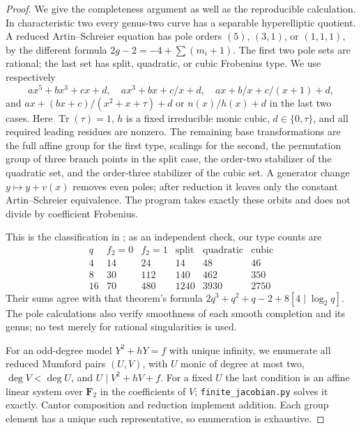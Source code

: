 \begin{proof}
We give the completeness argument as well as the reproducible
calculation.  In characteristic two every genus-two curve has a
separable hyperelliptic quotient.  A reduced Artin--Schreier equation
has pole orders $(5)$, $(3,1)$, or $(1,1,1)$, by the different formula
$2g-2=-4+\sum(m_i+1)$.  The first two pole sets are rational; the
last set has split, quadratic, or cubic Frobenius type.  We use
respectively
\[
 ax^5+bx^3+cx+d,\quad ax^3+bx+c/x+d,\quad
 ax+b/x+c/(x+1)+d,
\]
and $ax+(bx+c)/(x^2+x+\tau)+d$ or $n(x)/h(x)+d$ in the last
two cases.  Here $\operatorname{Tr}(\tau)=1$, $h$ is a fixed
irreducible monic cubic, $d\in\{0,\tau\}$, and all required
leading residues are nonzero.  The remaining base transformations
are the full affine group for the first type, scalings for the
second, the permutation group of three branch points in the split
case, the order-two stabilizer of the quadratic set, and the
order-three stabilizer of the cubic set.  A generator change
$y\mapsto y+v(x)$ removes even poles; after reduction it leaves
only the constant Artin--Schreier equivalence.  The program takes
exactly these orbits and does not divide by coefficient Frobenius.

This is the classification in \cite[Propositions~8--16,
Theorem~17]{AR_CNP2005}; as an independent check, our type counts are
\[
\begin{array}{c|rrrrr}
q&f_2=0&f_2=1&\text{split}&\text{quadratic}&\text{cubic}\\\hline
4&14&24&14&48&46\\
8&30&112&140&462&350\\
16&70&480&1240&3930&2750
\end{array}
\]
Their sums agree with that theorem's formula
$2q^3+q^2+q-2+8[4\mid\log_2q]$.  The pole calculations also verify
smoothness of each smooth completion and its genus; no test merely
for rational singularities is used.

For an odd-degree model $Y^2+hY=f$ with unique infinity, we enumerate
all reduced Mumford pairs $(U,V)$, with $U$ monic of degree at most
two, $\deg V<\deg U$, and
$U\mid V^2+hV+f$.  For a fixed $U$ the last condition is an affine
linear system over $\mathbf F_2$ in the coefficients of $V$;
\texttt{finite\_jacobian.py} solves it exactly.  Cantor composition
and reduction implement addition.  Each group element has a unique
such representative, so enumeration is exhaustive.


\end{proof}
